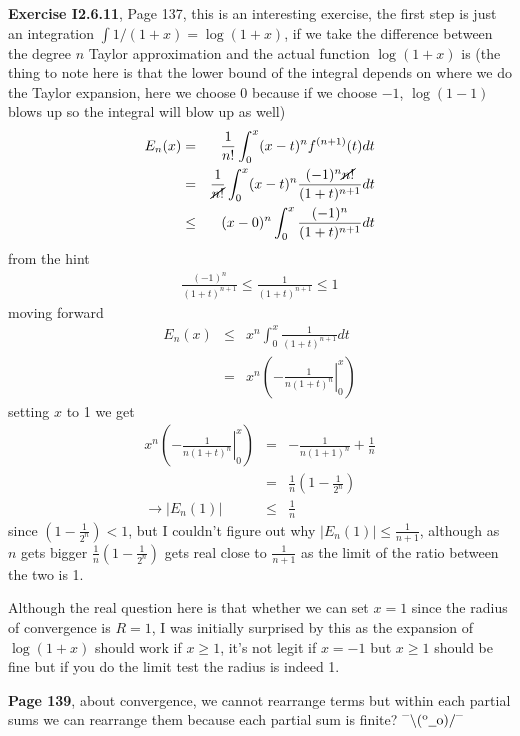\documentclass[aps,preprint,preprintnumbers,nofootinbib,showpacs,prd]{revtex4-1}
\newcommand{\nbea}{\begin{eqnarray*}}
\newcommand{\neea}{\end{eqnarray*}}
\newcommand{\dunno}{$ {}^{\mbox {--}}\backslash(^{\rm o}{}\underline{\hspace{0.2cm}}{\rm o})/^{\mbox {--}}$}
\begin{document}
{\bf Exercise I2.6.11}, Page 137, this is an interesting exercise, the first step is just an integration $\int 1/(1+x) = \log(1+x)$, if we take the difference between the degree $n$ Taylor approximation and the actual function $\log(1+x)$ is (the thing to note here is that the lower bound of the integral depends on where we do the Taylor expansion, here we choose 0 because if we choose $-1$, $\log(1-1)$ blows up so the integral will blow up as well)
%
\nbea
E_n(x) & = & \frac{1}{n!} \int_{0}^x(x-t)^nf^{(n+1)}(t) dt \\
& = & \frac{1}{\cancel{n!}} \int_{0}^x(x-t)^n \frac{(-1)^n\cancel{n!}}{(1+t)^{n+1}} dt \\
& \le & (x-0)^n \int_{0}^x \frac{(-1)^n}{(1+t)^{n+1}} dt 
\neea
%
from the hint
%
\nbea
\frac{(-1)^n}{(1+t)^{n+1}} \le \frac{1}{(1+t)^{n+1}} \le 1
\neea
%
moving forward
%
\nbea
E_n(x) & \le & x^n \int_{0}^x \frac{1}{(1+t)^{n+1}} dt \\ 
& = & x^n \left(\left.-\frac{1}{n(1+t)^{n}}\right|_0^x\right)
\neea
%
setting $x$ to 1 we get
%
\nbea
x^n \left(\left.-\frac{1}{n(1+t)^{n}}\right|_0^x\right) & = & -\frac{1}{n(1+1)^{n}} + \frac{1}{n} \\
& = & \frac{1}{n} \left(1 - \frac{1}{2^n}\right) \\
\to |E_n(1)|& \le & \frac{1}{n}
\neea
%
since $\left(1 - \frac{1}{2^n}\right) < 1$, but I couldn't figure out why $|E_n(1)|\le \frac{1}{n+1}$, although as $n$ gets bigger $\frac{1}{n} \left(1 - \frac{1}{2^n}\right)$ gets real close to $\frac{1}{n+1}$ as the limit of the ratio between the two is 1.

Although the real question here is that whether we can set $x=1$ since the radius of convergence is $R=1$, I was initially surprised by this as the expansion of $\log(1+x)$ should work if $x \ge 1$, it's not legit if $x=-1$ but $x\ge 1$ should be fine but if you do the limit test the radius is indeed 1.

{\bf Page 139}, about convergence, we cannot rearrange terms but within each partial sums we can rearrange them because  each partial sum is finite? \dunno
\end{document}

